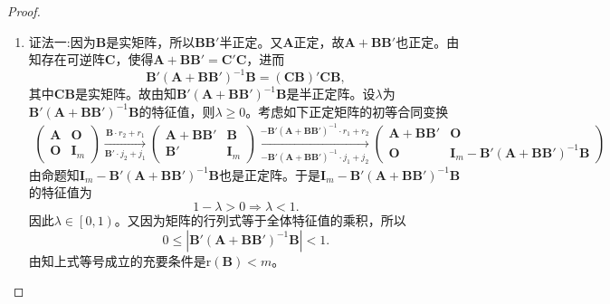 \documentclass[../../main.tex]{subfiles}
\begin{document}
\begin{proof}
\begin{enumerate}[(1)]
\item {\color{blue}证法一:}因为$\boldsymbol{B}$是实矩阵，所以$\boldsymbol{BB}'$半正定。又$\boldsymbol{A}$正定，故$\boldsymbol{A}+\boldsymbol{BB}'$也正定。由知存在可逆阵$\boldsymbol{C}$，使得$\boldsymbol{A}+\boldsymbol{BB}'=\boldsymbol{C}'\boldsymbol{C}$，进而
$$\boldsymbol{B}'\left( \boldsymbol{A}+\boldsymbol{BB}' \right) ^{-1}\boldsymbol{B}=\left( \boldsymbol{CB} \right) '\boldsymbol{CB},$$
其中$\boldsymbol{CB}$是实矩阵。故由知$\boldsymbol{B}'\left( \boldsymbol{A}+\boldsymbol{BB}' \right) ^{-1}\boldsymbol{B}$是半正定阵。设$\lambda$为$\boldsymbol{B}'\left( \boldsymbol{A}+\boldsymbol{BB}' \right) ^{-1}\boldsymbol{B}$的特征值，则$\lambda \geqslant 0$。考虑如下正定矩阵的初等合同变换
\begin{align*}
\begin{pmatrix} 
\boldsymbol{A} & \boldsymbol{O} \\ 
\boldsymbol{O} & \boldsymbol{I}_m 
\end{pmatrix} 
\xrightarrow[\boldsymbol{B}' \cdot j_2 + j_1]{\boldsymbol{B} \cdot r_2 + r_1} 
\begin{pmatrix} 
\boldsymbol{A} + \boldsymbol{BB}' & \boldsymbol{B} \\ 
\boldsymbol{B}' & \boldsymbol{I}_m 
\end{pmatrix} 
\xrightarrow[-\boldsymbol{B}'(\boldsymbol{A} + \boldsymbol{BB}')^{-1} \cdot j_1 + j_2]{-\boldsymbol{B}'(\boldsymbol{A} + \boldsymbol{BB}')^{-1} \cdot r_1 + r_2} 
\begin{pmatrix} 
\boldsymbol{A} + \boldsymbol{BB}' & \boldsymbol{O} \\ 
\boldsymbol{O} & \boldsymbol{I}_m - \boldsymbol{B}'(\boldsymbol{A} + \boldsymbol{BB}')^{-1}\boldsymbol{B} 
\end{pmatrix}
\end{align*}
由命题知$\boldsymbol{I}_m-\boldsymbol{B}'\left( \boldsymbol{A}+\boldsymbol{BB}' \right) ^{-1}\boldsymbol{B}$也是正定阵。于是$\boldsymbol{I}_m-\boldsymbol{B}'\left( \boldsymbol{A}+\boldsymbol{BB}' \right) ^{-1}\boldsymbol{B}$的特征值为
$$1-\lambda >0\Longrightarrow \lambda <1.$$
因此$\lambda \in \left[ 0,1 \right)$。又因为矩阵的行列式等于全体特征值的乘积，所以
$$0\leqslant \left| \boldsymbol{B}'\left( \boldsymbol{A}+\boldsymbol{BB}' \right) ^{-1}\boldsymbol{B} \right|<1.$$
由知上式等号成立的充要条件是$\mathrm{r}\left( \boldsymbol{B} \right) <m$。


\end{enumerate}
\end{proof}
\end{document}

